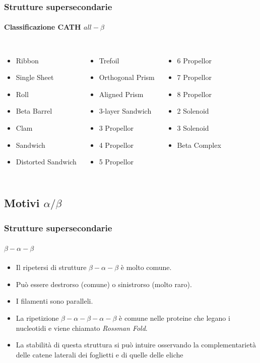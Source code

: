 \documentclass{beamer}
\begin{document}
\begin{frame}
 \frametitle{Strutture supersecondarie}
  \framesubtitle{Classificazione CATH $all-\beta$}
\begin{columns}
\begin{itemize}
 \item Ribbon
 \item Single Sheet
 \item Roll
 \item Beta Barrel
 \item Clam
 \item Sandwich
 \item Distorted Sandwich
\end{itemize}

\begin{itemize}
 \item Trefoil
 \item Orthogonal Prism
 \item Aligned Prism
 \item 3-layer Sandwich
 \item 3 Propellor
 \item 4 Propellor
 \item 5 Propellor
\end{itemize}
\begin{itemize}
 \item 6 Propellor
 \item 7 Propellor
 \item 8 Propellor
 \item 2 Solenoid
 \item 3 Solenoid
 \item Beta Complex
\end{itemize}
\end{columns}
\end{frame}

\subsection{Motivi $\alpha/\beta$}
\begin{frame}
\frametitle{Strutture supersecondarie}
  \framesubtitle{$\beta-\alpha-\beta$}
\begin{itemize}
\item Il ripetersi di strutture $\beta-\alpha-\beta$ è molto comune.
\pause   \item Può essere destrorso (comune) o sinistrorso (molto raro).
\pause   \item I filamenti sono paralleli.
\pause  \item La ripetizione $\beta-\alpha-\beta-\alpha-\beta$ è comune nelle proteine che legano i nucleotidi e viene chiamato \emph{Rossman Fold}.
\pause  \item La stabilità di questa struttura si può intuire osservando la complementarietà delle catene laterali dei foglietti e di quelle delle eliche
\end{itemize}
\end{frame}
\end{document}
